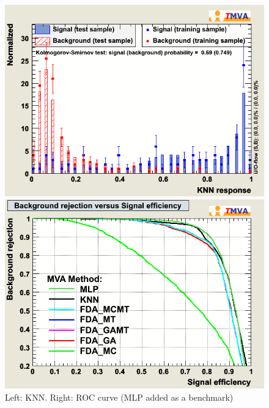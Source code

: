 \begin{figure}[h]
 \begin{minipage}{8.5cm}
\includegraphics[width=1.0\textwidth]{images/pkOvertrain_KNN.png}
\end{minipage}
 \hfill
\begin{minipage}{8.5cm}
\includegraphics[width=1.0\textwidth]{images/pkRejBvsS.png}
\end{minipage}
\caption{Left: KNN. Right: ROC curve (MLP added as a benchmark)}
\label{fig:pkOvertrainKNN}
\end{figure}

\clearpage
